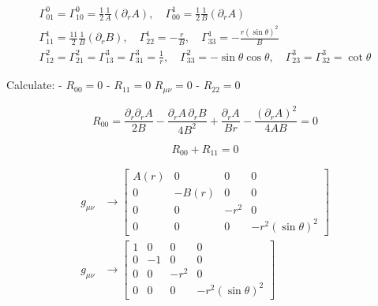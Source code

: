 \begin{equation}
    \begin{gathered}
        \Gamma_{01}^0=\Gamma_{10}^0=\frac{1}{2} \frac{1}{A}\left(\partial_r A\right), \quad \Gamma_{00}^1=\frac{1}{2} \frac{1}{B}\left(\partial_r A\right) \\
        \Gamma_{11}^1=\frac{11}{2} \frac{1}{B}\left(\partial_r B\right), \quad \Gamma_{22}^1=-\frac{r}{B}, \quad \Gamma_{33}^1=-\frac{r(\sin \theta)^2}{B} \\
        \Gamma_{12}^2=\Gamma_{21}^2=\Gamma_{13}^3=\Gamma_{31}^3=\frac{1}{r}, \quad \Gamma_{33}^2=-\sin \theta \cos \theta, \quad \Gamma_{23}^3=\Gamma_{32}^3=\cot \theta
    \end{gathered}
\end{equation}

Calculate:
- $R_{00}=0$
- $R_{11}=0$
$R_{\mu \nu}=0$
- $R_{22}=0$

\begin{equation}
    R_{00}=\frac{\partial_r \partial_r A}{2 B}
    -\frac{\partial_r A \,\partial_r B}{4 B^2}
    +\frac{\partial_r A}{B r}
    -\frac{\left(\partial_r A\right)^2}{4 A B}=0
\end{equation}

\begin{equation}
    R_{00}+R_{11}=0
\end{equation}

\begin{equation}
    \begin{aligned}
        g_{\mu \nu} & \rightarrow\left[\begin{array}{cccc}
                A(r) & 0     & 0    & 0                   \\
                0    & -B(r) & 0    & 0                   \\
                0    & 0     & -r^2 & 0                   \\
                0    & 0     & 0    & -r^2(\sin \theta)^2
            \end{array}\right] \\
        g_{\mu \nu} & \rightarrow\left[\begin{array}{cccc}
                1 & 0  & 0    & 0                   \\
                0 & -1 & 0    & 0                   \\
                0 & 0  & -r^2 & 0                   \\
                0 & 0  & 0    & -r^2(\sin \theta)^2
            \end{array}\right]
    \end{aligned}
\end{equation}

